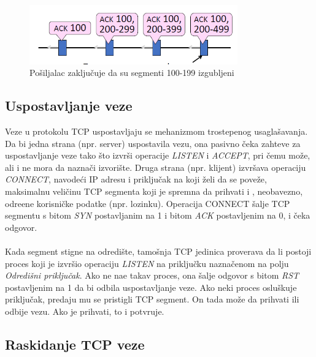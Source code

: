 \documentclass{article} %
\begin{document}
\begin{figure}[H]
	\centering
	\includegraphics[width=0.8\textwidth]{tcp/posiljalac.png}
	\caption{Po\v siljalac zaklju\v cuje da su segmenti 100-199 izgubljeni}
\end{figure}


\subsection{Uspostavljanje veze}

Veze u protokolu TCP uspostavljaju se mehanizmom trostepenog usagla\v savanja. Da bi jedna strana (npr. server) uspostavila vezu, ona pasivno \v ceka zahteve za uspostavljanje veze tako \v sto izvr\v si operacije \textit{LISTEN} i \textit{ACCEPT}, pri \v cemu mo\v ze, ali i ne mora da nazna\v ci izvori\v ste. Druga strana (npr. klijent) izvr\v sava operaciju \textit{CONNECT}, navode\' ci IP adresu i priklju\v cak  na koji \v zeli da se pove\v ze, maksimalnu veli\v cinu TCP segmenta koji je spremna da prihvati i , neobavezno, odre\dj ene korisni\v cke podatke (npr. lozinku). Operacija CONNECT \v salje TCP segmentu s bitom \textit{SYN} postavljanim na 1 i bitom \textit{ACK} postavljenim na 0, i \v ceka odgovor.  
\\
\\ Kada segment stigne na odredi\v ste, tamo\v snja TCP jedinica proverava da li postoji proces koji je izvr\v sio operaciju \textit{LISTEN} na priklju\v cku nazna\v cenom na polju \textit{Odredi\v sni priklju\v cak}. Ako ne na\dj e takav proces, ona \v salje odgovor s bitom \textit{RST} postavljenim na 1 da bi odbila uspostavljanje veze. Ako neki proces oslu\v skuje priklju\v cak, predaju mu se pristigli TCP segment. On tada mo\v ze da prihvati ili odbije vezu. Ako je prihvati, to i potvr\dj uje.


\subsection{Raskidanje TCP veze}
\end{document}
